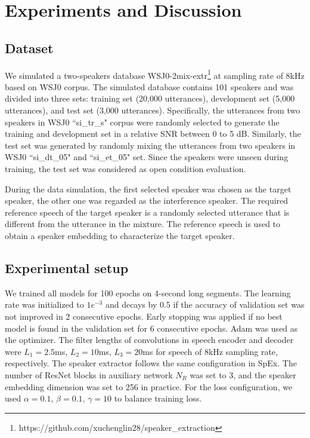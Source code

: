\documentclass[a4paper]{article}
\begin{document}
\section{Experiments and Discussion}

\subsection{Dataset}

We simulated a two-speakers database WSJ0-2mix-extr\footnote{https://github.com/xuchenglin28/speaker\_extraction} at sampling rate of 8kHz based on WSJ0 corpus. The simulated database contains 101 speakers and was divided into three sets: training set (20,000 utterances), development set (5,000 utterances), and test set (3,000 utterances). Specifically, the utterances from two speakers in WSJ0 ``si\_tr\_s" corpus were randomly selected to generate the training and development set in a relative SNR between 0 to 5 dB. Similarly, the test set was generated by randomly mixing the utterances from two speakers in WSJ0 ``si\_dt\_05" and ``si\_et\_05" set. Since the speakers were unseen during training, the test set was considered as open condition evaluation. 

During the data simulation, the first selected speaker was chosen as the target speaker, the other one was regarded as the interference speaker. The required reference speech of the target speaker is a randomly selected utterance that is different from the utterance in the mixture. The reference speech is used to obtain a speaker embedding to characterize the target speaker.

\subsection{Experimental setup}

We trained all models for 100 epochs on 4-second long segments. The learning rate was initialized to $1e^{-3}$ and decays by 0.5 if the accuracy of validation set was not improved in 2 consecutive epochs. Early stopping was applied if no best model is found in the validation set for 6 consecutive epochs. Adam was used as the optimizer. 
The filter lengths of convolutions in speech encoder and decoder were $L_1=2.5$ms, $L_2=10$ms, $L_3=20$ms for speech of 8kHz sampling rate,
respectively. The speaker extractor follows the same configuration in SpEx\cite{spex2020}. The number of ResNet blocks in auxiliary network $N_R$ was set to 3, and the speaker embedding dimension was set to 256 in practice. For the loss configuration, we used $\alpha=0.1$, $\beta=0.1$, $\gamma=10$ to balance training loss. 
\end{document}
